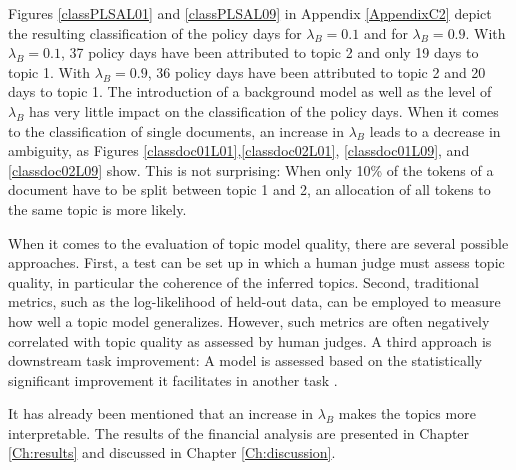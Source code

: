 \documentclass[11pt,a4paper,english,oneside]{book}
\numberwithin{equation}{chapter}
\begin{document}
Figures \ref{classPLSAL01} and \ref{classPLSAL09} in Appendix \ref{AppendixC2} depict the resulting classification of the policy days for $\lambda_B=0.1$ and for $\lambda_B=0.9$. With $\lambda_B=0.1$, 37 policy days have been attributed to topic 2 and only 19 days to topic 1. With  $\lambda_B=0.9$,  36 policy days have been attributed to topic 2 and 20 days to topic 1. The introduction of a background model as well as the level of $\lambda_B$ has very little impact on the classification of the policy days. When it comes to the classification of single documents, an increase in $\lambda_B$ leads to a decrease in ambiguity, as Figures \ref{classdoc01L01},\ref{classdoc02L01}, \ref{classdoc01L09}, and \ref{classdoc02L09} show. This is not surprising: When only 10\% of the tokens of a document have to be split between topic 1 and 2, an allocation of all tokens to the same topic is more likely.


When it comes to the evaluation of topic model quality, there are several possible approaches. First, a test can be set up in which a human judge must assess topic quality, in particular the coherence of the inferred topics. Second, traditional metrics, such as the log-likelihood of held-out data, can be employed to measure how well a topic model generalizes. However, such metrics are often negatively correlated with topic quality as assessed by human judges. A third approach is downstream task improvement: A model is assessed based on the statistically significant improvement it facilitates in another task \cite[~pp.383--384]{Zhai.2016}.

It has already been mentioned that an increase in $\lambda_B$ makes the topics more interpretable. The results of the financial analysis are presented in Chapter \ref{Ch:results} and discussed in Chapter \ref{Ch:discussion}. 
\end{document}
